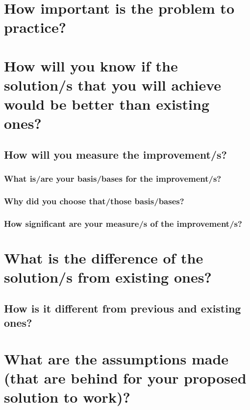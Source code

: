 


\section*{\thesection\quad  How important is the problem to practice?}
	
\section*{\thesection\quad  How will you know if the solution/s that you will achieve would be better than existing ones?}	

\subsection*{\thesubsection\quad How will you measure the improvement/s?}	

\subsubsection*{\thesubsubsection\quad  What is/are your basis/bases for the improvement/s?}

\subsubsection*{\thesubsubsection\quad  Why did you choose that/those basis/bases?}
		
\subsubsection*{\thesubsubsection\quad  How significant are your measure/s of the improvement/s?}

\section*{\thesection\quad What is the difference of the solution/s from existing ones?}
	
\subsection*{\thesubsection\quad How is it different from previous and existing ones?}

\section*{\thesection\quad What are the assumptions made (that are behind for your proposed solution to work)?}
	

